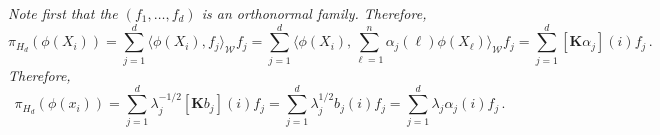 \documentclass[a4paper,10pt,fleqn]{article}
\newcommand{\eqsp}{\,}
\newcommand{\rset}{\ensuremath{\mathbb{R}}}
\newcommand{\W}{\ensuremath{\mathcal{W}}}
\newcommand{\1}{\ensuremath{\mathbbm{1}}}
\newcommand{\bfK}{\mathbf{K}}
\begin{document}
\begin{enumerate}
\vspace{.2cm}

{\em
Note first that the $(f_1,\ldots,f_d)$ is an orthonormal family. Therefore,
$$
\pi_{H_d}(\phi(X_i)) = \sum_{j=1}^d \langle \phi(X_i),f_j\rangle_{\W} f_j = \sum_{j=1}^d \langle \phi(X_i), \sum_{\ell=1}^n \alpha_j(\ell)\phi(X_{\ell})\rangle_{\W} f_j= \sum_{j=1}^d [\bfK\alpha_j](i)f_j\eqsp.
$$
Therefore,
$$
\pi_{H_d}(\phi(x_i)) = \sum_{j=1}^d \lambda^{-1/2}_j[\bfK b_j](i)f_j = \sum_{j=1}^d \lambda^{1/2}_jb_j(i)f_j =  \sum_{j=1}^d \lambda_{j}\alpha_j(i)f_j\eqsp.
$$
}
\end{enumerate}

%
%
%
%
%
\end{document}
